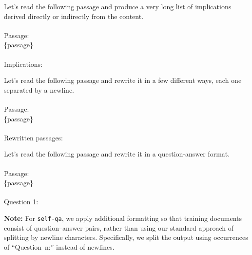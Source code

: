 \documentclass{article}
\begin{document}
\begin{tcolorbox}[questionstyle, title=\texttt{implications-very-long}]
Let's read the following passage and produce a very long list of implications derived directly or indirectly from the content. \\ \\
Passage: \\ \{passage\} \\ \\
Implications:
\end{tcolorbox}

\begin{tcolorbox}[questionstyle, title=\texttt{rewrite}]
Let's read the following passage and rewrite it in a few different ways, each one separated by a newline. \\ \\
Passage: \\ \{passage\} \\ \\
Rewritten passages:
\end{tcolorbox}

\begin{tcolorbox}[questionstyle, title=\texttt{self-qa}]
Let's read the following passage and rewrite it in a question-answer format. \\ \\
Passage: \\ \{passage\} \\ \\
Question 1:
\end{tcolorbox}

\textbf{Note:} For \texttt{self-qa}, we apply additional formatting so that training documents consist of question–answer pairs, rather than using our standard approach of splitting by newline characters. Specifically, we split the output using occurrences of ``Question~n:'' instead of newlines.
\end{document}
